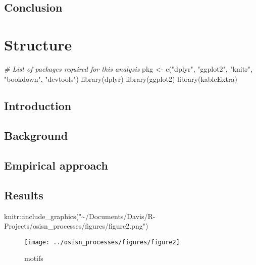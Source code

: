 \documentclass[twoside,12pt,final]{ucthesis-CA2012}
\newenvironment{Shaded}{}{}
\newcommand{\SpecialCharTok}[1]{\textcolor[rgb]{0.25,0.44,0.63}{{#1}}}
\newcommand{\StringTok}[1]{\textcolor[rgb]{0.25,0.44,0.63}{{#1}}}
\newcommand{\CommentTok}[1]{\textcolor[rgb]{0.38,0.63,0.69}{\textit{{#1}}}}
\newcommand{\OtherTok}[1]{\textcolor[rgb]{0.00,0.44,0.13}{{#1}}}
\newcommand{\FunctionTok}[1]{\textcolor[rgb]{0.02,0.16,0.49}{{#1}}}
\newcommand{\NormalTok}[1]{{#1}}
\begin{document}
\begin{ucmainmatter}
\hypertarget{conclusion-1}{%
\section{Conclusion}\label{conclusion-1}}

\hypertarget{process}{%
\chapter{Structure}\label{process}}

\begin{Shaded}
\begin{Highlighting}[]
\CommentTok{\# List of packages required for this analysis}
\NormalTok{pkg }\OtherTok{\textless{}{-}} \FunctionTok{c}\NormalTok{(}\StringTok{"dplyr"}\NormalTok{, }\StringTok{"ggplot2"}\NormalTok{, }\StringTok{"knitr"}\NormalTok{, }\StringTok{"bookdown"}\NormalTok{, }\StringTok{"devtools"}\NormalTok{)}
\FunctionTok{library}\NormalTok{(dplyr)}
\FunctionTok{library}\NormalTok{(ggplot2)}
\FunctionTok{library}\NormalTok{(kableExtra)}
\end{Highlighting}
\end{Shaded}
\hypertarget{introduction-3}{%
\section{Introduction}\label{introduction-3}}

\hypertarget{background-2}{%
\section{Background}\label{background-2}}

\hypertarget{empirical-approach-2}{%
\section{Empirical approach}\label{empirical-approach-2}}

\hypertarget{results-2}{%
\section{Results}\label{results-2}}
\begin{Shaded}
\begin{Highlighting}[]
\NormalTok{knitr}\SpecialCharTok{::}\FunctionTok{include\_graphics}\NormalTok{(}\StringTok{"\textasciitilde{}/Documents/Davis/R{-}Projects/osisn\_processes/figures/figure2.png"}\NormalTok{)}
\end{Highlighting}
\end{Shaded}
\begin{figure}
\texttt{[image: ../osisn\_processes/figures/figure2]} \caption{motifs}\label{fig:unnamed-chunk-6}
\end{figure}
\hypertarget{discussion-2}{%
}
\end{ucmainmatter}
\end{document}
